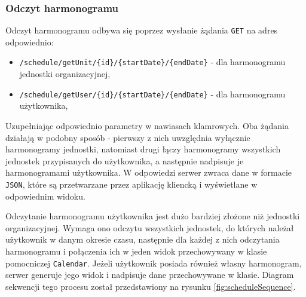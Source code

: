 \subsubsection{Odczyt harmonogramu}

Odczyt harmonogramu odbywa się poprzez wysłanie żądania \texttt{GET} na adres odpowiednio:
\begin{itemize}
    \item \texttt{/schedule/getUnit/\{id\}/\{startDate\}/\{endDate\}} - dla harmonogramu jednostki organizacyjnej,
    \item \texttt{/schedule/getUser/\{id\}/\{startDate\}/\{endDate\}} - dla harmonogramu użytkownika,
\end{itemize}
Uzupełniając odpowiednio parametry w nawiasach klamrowych. Oba żądania działają w podobny sposób - pierwszy z nich uwzględnia wyłącznie harmonogramy jednostki, natomiast drugi łączy harmonogramy wszystkich jednostek przypisanych do użytkownika, a następnie nadpisuje je harmonogramami użytkownika. W odpowiedzi serwer zwraca dane w formacie \texttt{JSON}, które są przetwarzane przez aplikację kliencką i wyświetlane w odpowiednim widoku.

Odczytanie harmonogramu użytkownika jest dużo bardziej złożone niż jednostki organizacyjnej. Wymaga ono odczytu wszystkich jednostek, do których należał użytkownik w danym okresie czasu, następnie dla każdej z nich odczytania harmonogramu i połączenia ich w jeden widok przechowywany w klasie pomocniczej \texttt{Calendar}. Jeżeli użytkownik posiada również własny harmonogram, serwer generuje jego widok i nadpisuje dane przechowywane w klasie. Diagram sekwencji tego procesu został przedstawiony na rysunku \ref{fig:scheduleSequence}.

